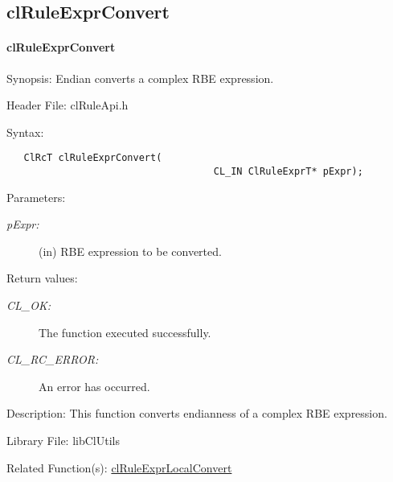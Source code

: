 \begin{flushleft}
\subsection{clRuleExprConvert}
\hypertarget{pagerule108}{}\paragraph{cl\-Rule\-Expr\-Convert}\label{pagerule108}
\begin{Desc}
\item[Synopsis:]Endian converts a complex RBE expression.\end{Desc}
\begin{Desc}
\item[Header File:]clRuleApi.h\end{Desc}
\begin{Desc}
\item[Syntax:]

\footnotesize\begin{verbatim}   ClRcT clRuleExprConvert(
                              		CL_IN ClRuleExprT* pExpr);
\end{verbatim}
\normalsize
\end{Desc}
\begin{Desc}
\item[Parameters:]
\begin{description}
\item[{\em p\-Expr:}](in) RBE expression to be converted.\end{description}
\end{Desc}
\begin{Desc}
\item[Return values:]
\begin{description}
\item[{\em CL\_\-OK:}]The function executed successfully. \item[{\em CL\_\-RC\_\-ERROR:}]An error has occurred.\end{description}
\end{Desc}
\begin{Desc}
\item[Description:]This function converts endianness of a complex RBE expression.\end{Desc}
\begin{Desc}
\item[Library File:]lib\-Cl\-Utils\end{Desc}
\begin{Desc}
\item[Related Function(s):]\hyperlink{pagerule107}{cl\-Rule\-Expr\-Local\-Convert} \end{Desc}
\newpage



\end{flushleft}
